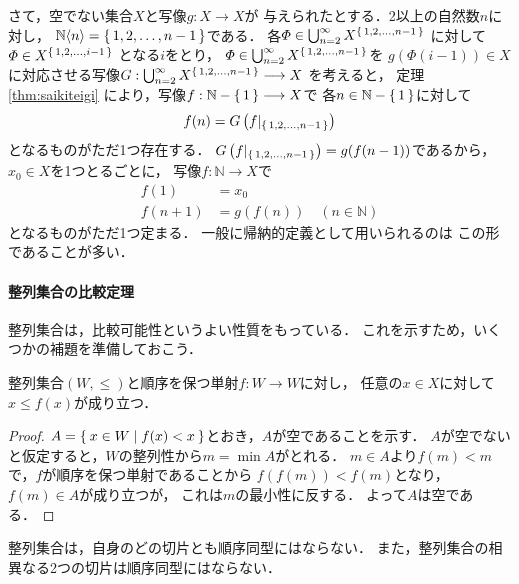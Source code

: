     さて，空でない集合$X$と写像$g: X \longrightarrow X$が
    与えられたとする．2以上の自然数$n$に対し，
    $\mathbb{N} \langle n \rangle 
    = \set{ 1,2, \ldots , n-1}$である．
    各$\varPhi \in \bigcup_{n=2}^{\infty} X^{\set{1,2,\ldots, n-1}}$
    に対して$\varPhi \in X^{\set{1,2,\ldots , i-1}}$
    となる$i$をとり，
    $\varPhi \in \bigcup_{n=2}^{\infty} 
    X^{\set{1,2,\ldots, n-1}}$を
    $g(\varPhi( i-1)) \in X$
    に対応させる写像$G: \bigcup_{n=2}^{\infty} X^{\set{1,2,\ldots, n-1}} 
    \longrightarrow X$
    を考えると，
    定理\ref{thm:saikiteigi}
    により，写像$f: \mathbb{N} - \set{1} \longrightarrow X$で
    各$n \in \mathbb{N} - \set{1}$に対して
    \[
      f(n) = G \left( f|_{\set{1,2,\ldots, n-1}} \right)
    \]
    となるものがただ1つ存在する．
    $G \left( f|_{\set{1,2,\ldots, n-1}} \right) 
    = g(f(n-1))$であるから，
    $x_0 \in X$を1つとるごとに，
    写像$f : \mathbb{N} \longrightarrow X$で
    \begin{align*}
      f(1) & = x_0 \\
      f(n+1) & = g( f(n) ) \quad (n \in \mathbb{N} )
    \end{align*}
    となるものがただ1つ定まる．
    一般に帰納的定義として用いられるのは
    この形であることが多い．

  


  \paragraph{整列集合の比較定理}

  整列集合は，比較可能性というよい性質をもっている．
  これを示すため，いくつかの補題を準備しておこう．


  \begin{lemma} \label{lemma:seijunjo}
    整列集合$(W, {\leq})$と順序を保つ単射$f: W \longrightarrow W$に対し，
    任意の$x \in X$に対して$x \leq f(x)$が成り立つ．
  \end{lemma}

  \begin{proof}
    $A = \Set{ x \in W \mid f(x) < x }$とおき，$A$が空であることを示す．
    $A$が空でないと仮定すると，$W$の整列性から$m = \min A$がとれる．
    $m \in A$より$f(m) < m$で，$f$が順序を保つ単射であることから
    $f(f(m)) < f(m)$となり，$f(m) \in A$が成り立つが，
    これは$m$の最小性に反する．
    よって$A$は空である．
  \end{proof}

  \begin{lemma} \label{lemma:sepdoukei}
    整列集合は，自身のどの切片とも順序同型にはならない．
    また，整列集合の相異なる2つの切片は順序同型にはならない．
  \end{lemma}

